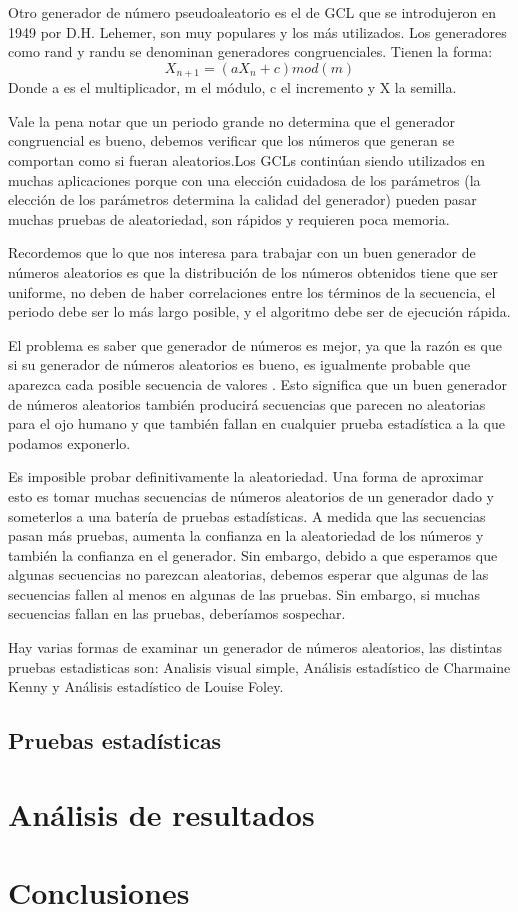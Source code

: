 Otro generador de número pseudoaleatorio es el de GCL que se introdujeron en 1949 por D.H. Lehemer, son muy populares y los más utilizados. Los generadores como rand y randu se denominan generadores congruenciales. Tienen la forma:
\begin{equation}
    X_{n+1} = (aX_{n}+c)mod(m)
\end{equation}
Donde a es el multiplicador, m el módulo, c el incremento y X la semilla.

Vale la pena notar que un periodo grande no determina que el generador congruencial es bueno, debemos verificar que los números que generan se comportan como si fueran aleatorios.Los GCLs continúan siendo utilizados en muchas aplicaciones porque con una elección cuidadosa de los parámetros (la elección de los parámetros determina la calidad del generador) pueden pasar muchas pruebas de aleatoriedad, son rápidos y requieren poca memoria.

Recordemos que lo que nos interesa para trabajar con un buen generador de números aleatorios es que la distribución de los números obtenidos tiene que ser uniforme, no deben de haber correlaciones entre los términos de la secuencia, el periodo debe ser lo más largo posible, y el algoritmo debe ser de ejecución rápida.

El problema es saber que generador de números es mejor, ya que la razón es que si su generador de números aleatorios es bueno, es igualmente probable que aparezca cada posible secuencia de valores . Esto significa que un buen generador de números aleatorios también producirá secuencias que parecen no aleatorias para el ojo humano y que también fallan en cualquier prueba estadística a la que podamos exponerlo. 


Es imposible probar definitivamente la aleatoriedad. Una forma de aproximar esto es tomar muchas secuencias de números aleatorios de un generador dado y someterlos a una batería de pruebas estadísticas. A medida que las secuencias pasan más pruebas, aumenta la confianza en la aleatoriedad de los números y también la confianza en el generador. Sin embargo, debido a que esperamos que algunas secuencias no parezcan aleatorias, debemos esperar que algunas de las secuencias fallen al menos en algunas de las pruebas. Sin embargo, si muchas secuencias fallan en las pruebas, deberíamos sospechar.

Hay varias formas de examinar un generador de números aleatorios, las distintas pruebas estadisticas son: Analisis visual simple, Análisis estadístico de Charmaine Kenny y Análisis estadístico de Louise Foley.
 
\subsection{Pruebas estadísticas}




\section{Análisis de resultados}


\section{Conclusiones}
